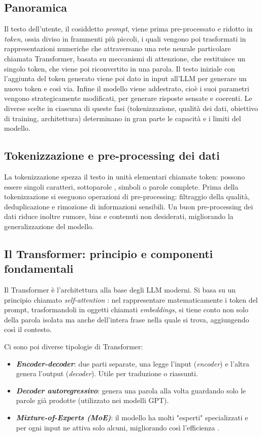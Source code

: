 \subsection{Panoramica}
Il testo dell'utente, il cosiddetto \textit{prompt}, viene prima pre-processato e ridotto in \textit{token}, ossia diviso in frammenti più piccoli,
i quali vengono poi trasformati in rappresentazioni numeriche che attraversano una rete neurale particolare chiamata Transformer, basata
su meccanismi di attenzione, che restituisce un singolo token, che viene poi riconvertito in una parola. Il testo iniziale con l'aggiunta del token
generato viene poi dato in input all'LLM per generare un nuovo token e così via. Infine il modello viene addestrato, cioè i suoi parametri vengono
strategicamente modificati, per generare risposte sensate e coerenti.
Le diverse scelte in ciascuna di queste fasi (tokenizzazione, qualità dei dati, obiettivo di training, architettura)
determinano in gran parte le capacità e i limiti del modello.

\subsection{Tokenizzazione e pre-processing dei dati}
La tokenizzazione \cite{webster1992tokenization} spezza il testo in unità elementari chiamate token: possono essere singoli caratteri,
sottoparole \cite{kudo2018subword}, simboli \cite{sennrich2016neural} o parole complete. Prima della tokenizzazione
si eseguono operazioni di pre-processing: filtraggio della qualità, deduplicazione e rimozione di informazioni sensibili.
Un buon pre-processing dei dati riduce inoltre rumore, bias e contenuti non desiderati, migliorando la generalizzazione del modello.

\subsection{Il Transformer: principio e componenti fondamentali}
Il Transformer è l'architettura alla base degli LLM moderni. Si basa su un principio chiamato \textit{self-attention} \cite{vaswani2017attention}:
nel rappresentare matematicamente i token del prompt, trasformandoli in oggetti chiamati \textit{embeddings}, si tiene conto non solo della parola
isolata ma anche dell'intera frase nella quale si trova, aggiungendo così il contesto.

Ci sono poi diverse tipologie di Transformer:
\begin{itemize}
    \item \textbf{\textit{Encoder-decoder}}: due parti separate, una legge l'input (\textit{encoder}) e l'altra genera l'output (\textit{decoder}).
    Utile per traduzione o riassunti.
    \item \textbf{\textit{Decoder autoregressivo}}: genera una parola alla volta guardando solo le parole già prodotte (utilizzato nei modelli GPT).
    \item \textbf{\textit{Mixture-of-Experts (MoE)}}: il modello ha molti "esperti" specializzati e per ogni input ne attiva solo alcuni,
    migliorando così l'efficienza \cite{fedus2022switch}\cite{du2022glam}\cite{ren2023pangu-p}.
\end{itemize}

